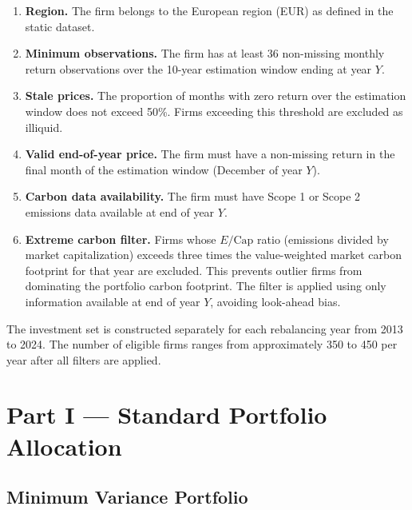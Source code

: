 \documentclass[12pt, a4paper]{article}
\begin{document}
\begin{enumerate}
    \item \textbf{Region.} The firm belongs to the European region (EUR) as 
    defined in the static dataset.
    
    \item \textbf{Minimum observations.} The firm has at least 36 non-missing 
    monthly return observations over the 10-year estimation window ending at 
    year $Y$.
    
    \item \textbf{Stale prices.} The proportion of months with zero return over 
    the estimation window does not exceed 50\%. Firms exceeding this threshold 
    are excluded as illiquid.
    
    \item \textbf{Valid end-of-year price.} The firm must have a non-missing 
    return in the final month of the estimation window (December of year $Y$).
    
    \item \textbf{Carbon data availability.} The firm must have Scope 1 or 
    Scope 2 emissions data available at end of year $Y$.
    
    \item \textbf{Extreme carbon filter.} Firms whose $E/\text{Cap}$ ratio 
    (emissions divided by market capitalization) exceeds three times the 
    value-weighted market carbon footprint for that year are excluded. This 
    prevents outlier firms from dominating the portfolio carbon footprint. 
    The filter is applied using only information available at end of year $Y$, 
    avoiding look-ahead bias.
\end{enumerate}

The investment set is constructed separately for each rebalancing year from 
2013 to 2024. The number of eligible firms ranges from approximately 350 to 
450 per year after all filters are applied.

\section{Part I --- Standard Portfolio Allocation}

\subsection{Minimum Variance Portfolio}
\end{document}
